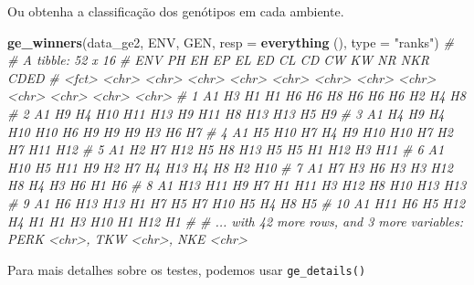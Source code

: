 \documentclass[
]{book}
\newenvironment{Shaded}{\begin{snugshade}}{\end{snugshade}}
\newcommand{\CommentTok}[1]{\textcolor[rgb]{0.56,0.35,0.01}{\textit{#1}}}
\newcommand{\DataTypeTok}[1]{\textcolor[rgb]{0.13,0.29,0.53}{#1}}
\newcommand{\KeywordTok}[1]{\textcolor[rgb]{0.13,0.29,0.53}{\textbf{#1}}}
\newcommand{\NormalTok}[1]{#1}
\newcommand{\StringTok}[1]{\textcolor[rgb]{0.31,0.60,0.02}{#1}}
\begin{document}
Ou obtenha a classificação dos genótipos em cada ambiente.

\begin{Shaded}
\begin{Highlighting}[]
\KeywordTok{ge_winners}\NormalTok{(data_ge2, ENV, GEN, }\DataTypeTok{resp =} \KeywordTok{everything}\NormalTok{ (), }\DataTypeTok{type =} \StringTok{"ranks"}\NormalTok{)}
\CommentTok{# # A tibble: 52 x 16}
\CommentTok{#    ENV   PH    EH    EP    EL    ED    CL    CD    CW    KW    NR    NKR   CDED }
\CommentTok{#    <fct> <chr> <chr> <chr> <chr> <chr> <chr> <chr> <chr> <chr> <chr> <chr> <chr>}
\CommentTok{#  1 A1    H3    H1    H1    H6    H6    H8    H6    H6    H6    H2    H4    H8   }
\CommentTok{#  2 A1    H9    H4    H10   H11   H13   H9    H11   H8    H13   H13   H5    H9   }
\CommentTok{#  3 A1    H4    H9    H4    H10   H10   H6    H9    H9    H9    H3    H6    H7   }
\CommentTok{#  4 A1    H5    H10   H7    H4    H9    H10   H10   H7    H2    H7    H11   H12  }
\CommentTok{#  5 A1    H2    H7    H12   H5    H8    H13   H5    H5    H1    H12   H3    H11  }
\CommentTok{#  6 A1    H10   H5    H11   H9    H2    H7    H4    H13   H4    H8    H2    H10  }
\CommentTok{#  7 A1    H7    H3    H6    H3    H3    H12   H8    H4    H3    H6    H1    H6   }
\CommentTok{#  8 A1    H13   H11   H9    H7    H1    H11   H3    H12   H8    H10   H13   H13  }
\CommentTok{#  9 A1    H6    H13   H13   H1    H7    H5    H7    H10   H5    H4    H8    H5   }
\CommentTok{# 10 A1    H11   H6    H5    H12   H4    H1    H1    H3    H10   H1    H12   H1   }
\CommentTok{# # ... with 42 more rows, and 3 more variables: PERK <chr>, TKW <chr>, NKE <chr>}
\end{Highlighting}
\end{Shaded}

Para mais detalhes sobre os testes, podemos usar \texttt{ge\_details()}
\end{document}
